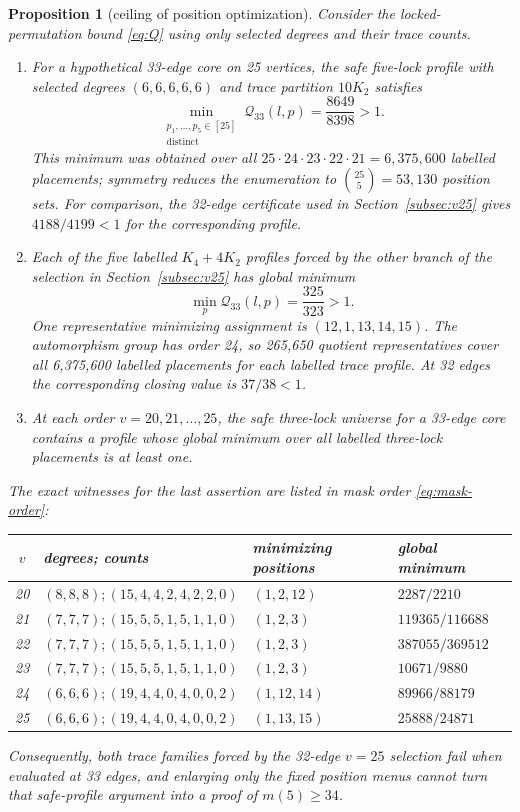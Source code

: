 \documentclass[11pt]{article}
\newtheorem{proposition}[theorem]{Proposition}
\theoremstyle{remark}
\newcommand{\Qlock}{\mathcal{Q}}
\begin{document}
\begin{proposition}[ceiling of position optimization]\label{prop:ceiling}
Consider the locked-permutation bound \eqref{eq:Q} using only selected
degrees and their trace counts.
\begin{enumerate}[label=(\roman*),leftmargin=2em]
\item For a hypothetical 33-edge core on 25 vertices, the safe five-lock
profile with selected degrees $(6,6,6,6,6)$ and trace partition $10K_2$
satisfies
\[
\min_{\substack{p_1,\ldots,p_5\in[25]\\\text{distinct}}}
\Qlock_{33}(l,p)=\frac{8649}{8398}>1.
\]
This minimum was obtained over all
$25\cdot24\cdot23\cdot22\cdot21=6{,}375{,}600$ labelled placements; symmetry
reduces the enumeration to $\binom{25}{5}=53{,}130$ position sets.
For comparison, the 32-edge certificate used in
Section~\ref{subsec:v25} gives $4188/4199<1$ for the corresponding profile.
\item Each of the five labelled $K_4+4K_2$ profiles forced by the other
branch of the selection in Section~\ref{subsec:v25} has global minimum
\[
\min_p\Qlock_{33}(l,p)=\frac{325}{323}>1.
\]
One representative minimizing assignment is $(12,1,13,14,15)$.  The
automorphism group has order 24, so 265,650 quotient representatives cover
all 6,375,600 labelled placements for each labelled trace profile.  At 32
edges the corresponding closing value is $37/38<1$.
\item At each order $v=20,21,\ldots,25$, the safe three-lock universe for a
33-edge core contains a profile whose global minimum over all labelled
three-lock placements is at least one.
\end{enumerate}
The exact witnesses for the last assertion are listed in mask order
\eqref{eq:mask-order}:
\begin{center}
\small
\begin{tabular}{@{}clll@{}}
\toprule
$v$ & degrees; counts & minimizing positions & global minimum\\
\midrule
20 & $(8,8,8);(15,4,4,2,4,2,2,0)$ & $(1,2,12)$ & $2287/2210$\\
21 & $(7,7,7);(15,5,5,1,5,1,1,0)$ & $(1,2,3)$ & $119365/116688$\\
22 & $(7,7,7);(15,5,5,1,5,1,1,0)$ & $(1,2,3)$ & $387055/369512$\\
23 & $(7,7,7);(15,5,5,1,5,1,1,0)$ & $(1,2,3)$ & $10671/9880$\\
24 & $(6,6,6);(19,4,4,0,4,0,0,2)$ & $(1,12,14)$ & $89966/88179$\\
25 & $(6,6,6);(19,4,4,0,4,0,0,2)$ & $(1,13,15)$ & $25888/24871$\\
\bottomrule
\end{tabular}
\end{center}
Consequently, both trace families forced by the 32-edge $v=25$ selection
fail when evaluated at 33 edges, and enlarging only the fixed position menus
cannot turn that safe-profile argument into a proof of $m(5)\ge34$.
\end{proposition}
\end{document}
